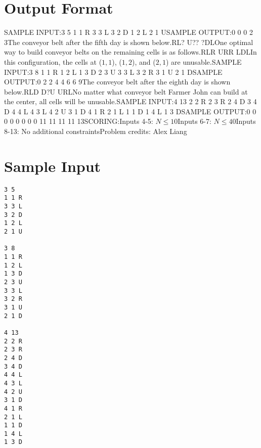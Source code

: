 \documentclass[12pt]{article}
\begin{document}
\section*{Output Format}
SAMPLE INPUT:3 5
1 1 R
3 3 L
3 2 D
1 2 L
2 1 USAMPLE OUTPUT:0
0
0
2
3The conveyor belt after the fifth day is shown below.RL?
U??
?DLOne optimal way to build conveyor belts on the remaining cells is as follows.RLR
URR
LDLIn this configuration, the cells at ($1, 1$), ($1, 2$), and ($2, 1$) are
unusable.SAMPLE INPUT:3 8
1 1 R
1 2 L
1 3 D
2 3 U
3 3 L
3 2 R
3 1 U
2 1 DSAMPLE OUTPUT:0
2
2
4
4
6
6
9The conveyor belt after the eighth day is shown below.RLD
D?U
URLNo matter what conveyor belt Farmer John can build at the center, all cells 
will be unusable.SAMPLE INPUT:4 13
2 2 R
2 3 R
2 4 D
3 4 D
4 4 L
4 3 L
4 2 U
3 1 D
4 1 R
2 1 L
1 1 D
1 4 L
1 3 DSAMPLE OUTPUT:0
0
0
0
0
0
0
0
11
11
11
11
13SCORING:Inputs 4-5: $N \le 10$Inputs 6-7: $N \le 40$Inputs 8-13: No additional constraintsProblem credits: Alex Liang

\section*{Sample Input}
\begin{verbatim}
3 5
1 1 R
3 3 L
3 2 D
1 2 L
2 1 U

3 8
1 1 R
1 2 L
1 3 D
2 3 U
3 3 L
3 2 R
3 1 U
2 1 D

4 13
2 2 R
2 3 R
2 4 D
3 4 D
4 4 L
4 3 L
4 2 U
3 1 D
4 1 R
2 1 L
1 1 D
1 4 L
1 3 D
\end{verbatim}
\end{document}
